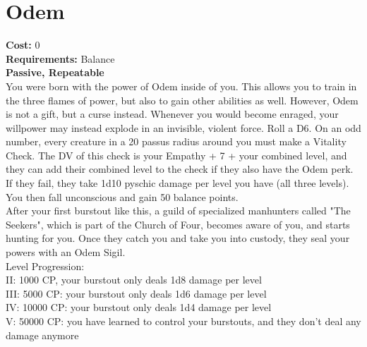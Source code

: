 \section{Odem}
\textbf{Cost:} 0\\
\textbf{Requirements:} Balance\\
\textbf{Passive, Repeatable}\\
You were born with the power of Odem inside of you. This allows you to train in the three flames of power, but also to gain other abilities as well. However, Odem is not a gift, but a curse instead. Whenever you would become enraged, your willpower may instead explode in an invisible, violent force. Roll a D6. On an odd number, every creature in a 20 passus radius around you must make a Vitality Check. The DV of this check is your Empathy + 7 + your combined level, and they can add their combined level to the check if they also have the Odem perk. If they fail, they take 1d10 pyschic damage per level you have (all three levels). You then fall unconscious and gain 50 balance points.\\
After your first burstout like this, a guild of specialized manhunters called "The Seekers", which is part of the Church of Four, becomes aware of you, and starts hunting for you. Once they catch you and take you into custody, they seal your powers with an Odem Sigil.
\\
Level Progression:\\
II: 1000 CP, your burstout only deals 1d8 damage per level\\
III: 5000 CP: your burstout only deals 1d6 damage per level\\
IV: 10000 CP: your burstout only deals 1d4 damage per level\\
V: 50000 CP: you have learned to control your burstouts, and they don't deal any damage anymore\\